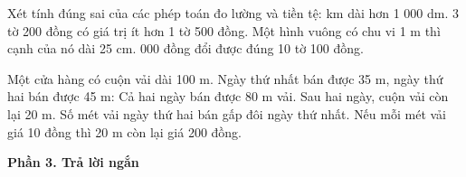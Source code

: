 \begin{ex} %
Xét tính đúng sai của các phép toán đo lường và tiền tệ:
\choiceTF
{ km dài hơn 1 000 dm.}
{3 tờ 200 đồng có giá trị ít hơn 1 tờ 500 đồng.}
{\True Một hình vuông có chu vi 1 m thì cạnh của nó dài 25 cm.}
{ 000 đồng đổi được đúng 10 tờ 100 đồng.}
\end{ex}

\begin{ex} %
Một cửa hàng có cuộn vải dài 100 m. Ngày thứ nhất bán được 35 m, ngày thứ hai bán được 45 m:
\choiceTF
{\True Cả hai ngày bán được 80 m vải.}
{\True Sau hai ngày, cuộn vải còn lại 20 m.}
{Số mét vải ngày thứ hai bán gấp đôi ngày thứ nhất.}
{\True Nếu mỗi mét vải giá 10 đồng thì 20 m còn lại giá 200 đồng.}
\end{ex}

\textbf{Phần 3. Trả lời ngắn}

